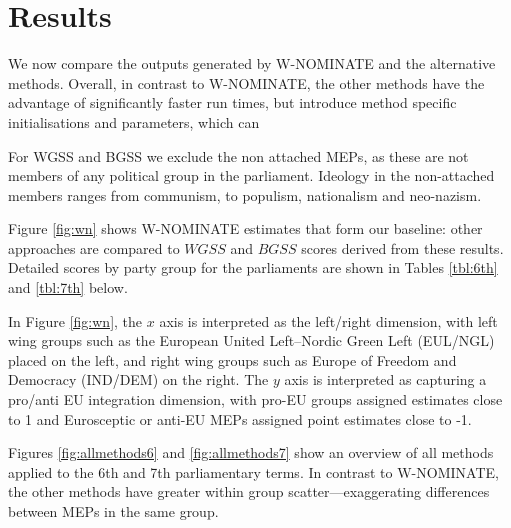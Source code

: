 \documentclass{llncs}
\begin{document}


\section{Results}
\label{sec:results}

We now compare the outputs generated by  W-NOMINATE and the alternative methods. Overall, in contrast to W-NOMINATE, the other methods have the advantage of significantly faster run times, but introduce method specific initialisations and parameters, which can 

For WGSS and BGSS we exclude the non attached MEPs, as these are not members of any political group in the parliament. Ideology in the non-attached members ranges from communism, to populism, nationalism and neo-nazism.

Figure \ref{fig:wn} shows W-NOMINATE estimates that form our baseline: other approaches are compared to $WGSS$ and $BGSS$ scores derived from these results. Detailed scores by party group for the parliaments are shown in Tables \ref{tbl:6th} and \ref{tbl:7th} below.

In Figure \ref{fig:wn}, the $x$ axis is interpreted as the left/right dimension, with left wing groups such as the European United Left–Nordic Green Left (EUL/NGL) placed on the left, and right wing groups such as Europe of Freedom and Democracy (IND/DEM) on the right. The $y$ axis is interpreted as capturing a pro/anti EU integration dimension, with pro-EU groups assigned estimates close to 1 and Eurosceptic or anti-EU MEPs assigned point estimates close to -1.

Figures \ref{fig:allmethods6} and \ref{fig:allmethods7} show an overview of all methods applied to the 6th and 7th parliamentary terms. In contrast to W-NOMINATE, the other methods have greater within group scatter---exaggerating differences between MEPs in the same group.
\end{document}
